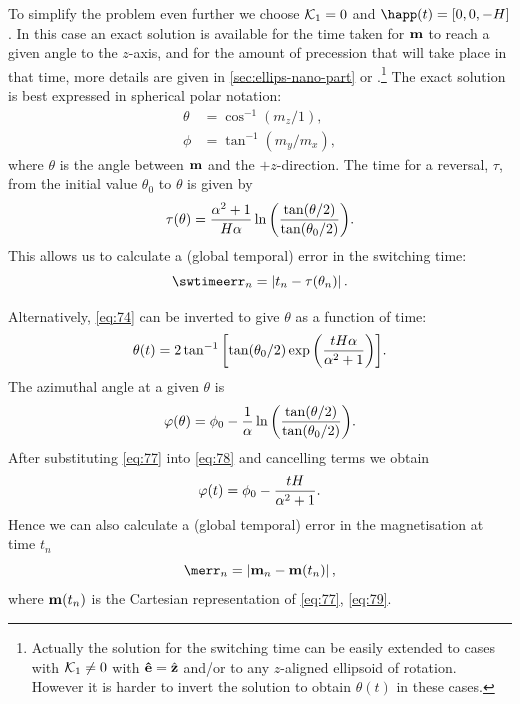 To simplify the problem even further we choose $\mathcal{K}_1 = 0$ and $\happ(t) = [0, 0, -H]$.
In this case an exact solution is available for the time taken for $\boldsymbol{\mathrm{m}}$ to reach a given angle to the $z$-axis, and for the amount of precession that will take place in that time, more details are given in \cref{sec:ellips-nano-part} or \cite{Mallinson2000}.\footnote{Actually the solution for the switching time can be easily extended to cases with $\mathcal{K}_1 \neq 0$ with $\boldsymbol{\mathrm{\hat{e}}} = {\hat{\mathbf{z}}}$ and/or to any $z$-aligned ellipsoid of rotation.
However it is harder to invert the solution to obtain $\theta(t)$ in these cases.}
The exact solution is best expressed in spherical polar notation:
\begin{equation}
  \begin{aligned}
    \theta &= \cos^{-1}(m_z/1),\\
    \phi &= \tan^{-1}(m_y/m_x),
  \end{aligned}
\end{equation}
where $\theta$ is the angle between $\boldsymbol{\mathrm{m}}$ and the $+z$-direction.
The time for a reversal, $\tau$, from the initial value $\theta_0$ to $\theta$ is given by
\begin{equation}
  \tau(\theta) = \frac{\alpha^2 +1}{H \alpha}
  \ln {\left(  \frac{\tan(\theta/2)}{\tan(\theta_0/2)}  \right)}.
  \label{eq:74}
\end{equation}
This allows us to calculate a (global temporal) error in the switching time:
\begin{equation}
  \swtimeerr_n = \abs{t_n - \tau(\theta_n)}.
  \label{eq:sw-time-error}
\end{equation}

Alternatively, \cref{eq:74} can be inverted to give $\theta$ as a function of time:
\begin{equation}
  \theta(t) = 2 \tan^{-1} {\left[  \tan(\theta_0/2) \exp{\left( \frac{tH\alpha}{\alpha^2 + 1} \right)} \right]}.
\label{eq:77}
\end{equation}
The azimuthal angle at a given $\theta$ is \cite{Mallinson2000}
\begin{equation}
  \varphi(\theta) = \phi_0 -  \frac{1}{\alpha} \ln {\left(  \frac{\tan(\theta/2)}{\tan(\theta_0/2)}  \right)}.
\label{eq:78}
\end{equation}
After substituting \cref{eq:77} into \cref{eq:78} and cancelling terms we obtain
\begin{equation}
  \varphi(t) = \phi_0 - \frac{tH}{\alpha^2 + 1}.
  \label{eq:79}
\end{equation}
Hence we can also calculate a (global temporal) error in the magnetisation at time $t_n$
\begin{equation}
  \merr_n = \abs{\mv_n - \mv(t_n)},
\label{eq:m-sphere-error}
\end{equation}
where $\boldsymbol{\mathrm{m}}(t_n)$ is the Cartesian representation of \cref{eq:77}, \cref{eq:79}.

